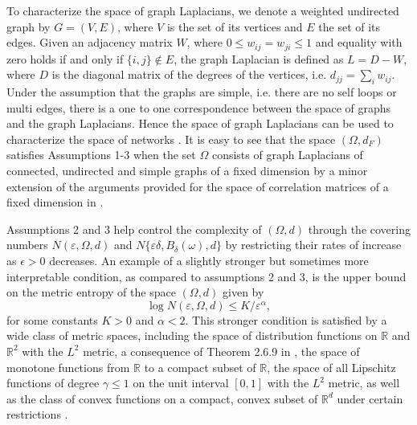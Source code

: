 \documentclass[lineno]{biometrika}
\def\cp{\citep}
\def\cp{\citep}
\def\eps{\varepsilon}
\def\o{\omega}
\def\O{\Omega}
\begin{document}
To characterize the space of graph Laplacians, we denote a weighted undirected graph by $G=(V,E)$, where $V$ is the set of its vertices and $E$ the set of its edges. Given an  adjacency matrix $W$, where $0 \leq w_{ij}=w_{ji} \leq 1$ and equality with zero holds if and only if $\{i,j\} \notin E$, the graph Laplacian is defined as  $L=D-W$, where $D$ is the diagonal matrix of the degrees of the vertices, i.e. $d_{jj}=\sum_{i}w_{ij}$. Under the assumption that the graphs are simple, i.e. there are no self loops or multi edges, there is a one to one correspondence between the space of graphs and the graph Laplacians. Hence the space of graph Laplacians can be used to characterize the space of networks \cp{gine:17}. It is easy to see that the space $(\O,d_F)$ satisfies Assumptions 1-3 when the set $\O$  consists of graph Laplacians of connected, undirected and simple graphs of a fixed dimension by a minor extension of the arguments provided for the space of correlation matrices of a fixed dimension in \cite{mull:19:3}.

Assumptions 2 and 3 help control the complexity of $(\O,d)$ %
through the covering numbers $N(\eps,\O,d)$ and $N\{\eps\delta,B_\delta(\o),d\}$ by restricting their rates of increase as  $\epsilon > 0$ decreases. An example of a slightly stronger but sometimes  more interpretable condition, as compared to assumptions 2 and 3, is the upper bound on  the metric entropy of the space $(\O,d)$ given by 
	\begin{equation*}
	\log N(\eps,\O,d) \leq K/\eps^\alpha,
	\end{equation*}
for some constants $K>0$ and $\alpha < 2$.  This stronger condition is satisfied by a wide class of metric spaces, including the space of distribution functions on $\mathbb{R}$ and  $\mathbb{R}^2$ with the $L^2$ metric, a consequence of Theorem 2.6.9 in \citep{well:96}, the space of  monotone functions from $\mathbb{R}$ to a compact subset of $\mathbb{R}$, the space of all Lipschitz functions of degree $\gamma \leq 1$ on the unit interval $[0,1]$ with the $L^2$ metric, as well as the class of convex functions on a compact, convex subset of $\mathbb{R}^d$ under certain restrictions \cp{well:96}.
\end{document}
